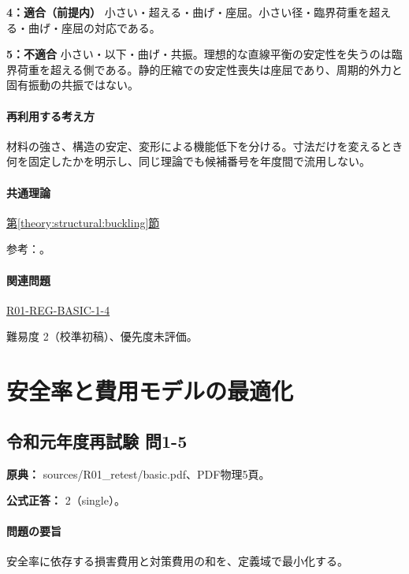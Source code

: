 \noindent\textbf{4：適合（前提内）} 小さい・超える・曲げ・座屈。小さい径・臨界荷重を超える・曲げ・座屈の対応である。\par

\noindent\textbf{5：不適合} 小さい・以下・曲げ・共振。理想的な直線平衡の安定性を失うのは臨界荷重を超える側である。静的圧縮での安定性喪失は座屈であり、周期的外力と固有振動の共振ではない。\par

\paragraph{再利用する考え方} 材料の強さ、構造の安定、変形による機能低下を分ける。寸法だけを変えるとき何を固定したかを明示し、同じ理論でも候補番号を年度間で流用しない。

\paragraph{共通理論} \hyperref[theory:structural:buckling]{第\ref*{theory:structural:buckling}節}

\par 参考：\cite{struct_mit_beam,struct_mit_buckling,struct_mlit_limit}。

\paragraph{関連問題} \hyperref[q:r01-reg-basic-1-4]{R01-REG-BASIC-1-4}

\par 難易度 2（校準初稿）、優先度未評価。

\section{安全率と費用モデルの最適化}

\subsection{令和元年度再試験 問1-5}
\label{q:r01-ret-basic-1-5}

\noindent\textbf{原典：} sources/R01\_retest/basic.pdf、PDF物理5頁。

\textbf{公式正答：} 2（single）。

\paragraph{問題の要旨} 安全率に依存する損害費用と対策費用の和を、定義域で最小化する。

